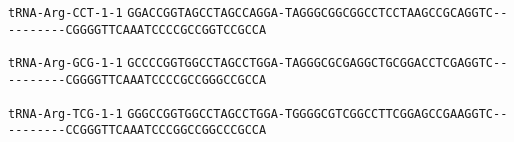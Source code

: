 \documentclass{article}
\newcommand{\rnabox}[1]{\colorbox{#1}{\texttt{#1}}}
\begin{document}
\vspace{-0.5mm}

\texttt{tRNA-Arg-CCT-1-1}
\rnabox{G}\rnabox{G}\rnabox{A}\rnabox{C}\rnabox{C}\rnabox{G}\rnabox{G}\rnabox{T}\rnabox{A}\rnabox{G}\rnabox{C}\rnabox{C}\rnabox{T}\rnabox{A}\rnabox{G}\rnabox{C}\rnabox{C}\rnabox{A}\rnabox{G}\rnabox{G}\rnabox{A}\rnabox{-}\rnabox{T}\rnabox{A}\rnabox{G}\rnabox{G}\rnabox{G}\rnabox{C}\rnabox{G}\rnabox{G}\rnabox{C}\rnabox{G}\rnabox{G}\rnabox{C}\rnabox{C}\rnabox{T}\rnabox{C}\rnabox{C}\rnabox{T}\rnabox{A}\rnabox{A}\rnabox{G}\rnabox{C}\rnabox{C}\rnabox{G}\rnabox{C}\rnabox{A}\rnabox{G}\rnabox{G}\rnabox{T}\rnabox{C}\rnabox{-}\rnabox{-}\rnabox{-}\rnabox{-}\rnabox{-}\rnabox{-}\rnabox{-}\rnabox{-}\rnabox{-}\rnabox{-}\rnabox{C}\rnabox{G}\rnabox{G}\rnabox{G}\rnabox{G}\rnabox{T}\rnabox{T}\rnabox{C}\rnabox{A}\rnabox{A}\rnabox{A}\rnabox{T}\rnabox{C}\rnabox{C}\rnabox{C}\rnabox{C}\rnabox{G}\rnabox{C}\rnabox{C}\rnabox{G}\rnabox{G}\rnabox{T}\rnabox{C}\rnabox{C}\rnabox{G}\rnabox{C}\rnabox{C}\rnabox{A}

\vspace{-0.5mm}

\texttt{tRNA-Arg-GCG-1-1}
\rnabox{G}\rnabox{C}\rnabox{C}\rnabox{C}\rnabox{C}\rnabox{G}\rnabox{G}\rnabox{T}\rnabox{G}\rnabox{G}\rnabox{C}\rnabox{C}\rnabox{T}\rnabox{A}\rnabox{G}\rnabox{C}\rnabox{C}\rnabox{T}\rnabox{G}\rnabox{G}\rnabox{A}\rnabox{-}\rnabox{T}\rnabox{A}\rnabox{G}\rnabox{G}\rnabox{G}\rnabox{C}\rnabox{G}\rnabox{C}\rnabox{G}\rnabox{A}\rnabox{G}\rnabox{G}\rnabox{C}\rnabox{T}\rnabox{G}\rnabox{C}\rnabox{G}\rnabox{G}\rnabox{A}\rnabox{C}\rnabox{C}\rnabox{T}\rnabox{C}\rnabox{G}\rnabox{A}\rnabox{G}\rnabox{G}\rnabox{T}\rnabox{C}\rnabox{-}\rnabox{-}\rnabox{-}\rnabox{-}\rnabox{-}\rnabox{-}\rnabox{-}\rnabox{-}\rnabox{-}\rnabox{-}\rnabox{C}\rnabox{G}\rnabox{G}\rnabox{G}\rnabox{G}\rnabox{T}\rnabox{T}\rnabox{C}\rnabox{A}\rnabox{A}\rnabox{A}\rnabox{T}\rnabox{C}\rnabox{C}\rnabox{C}\rnabox{C}\rnabox{G}\rnabox{C}\rnabox{C}\rnabox{G}\rnabox{G}\rnabox{G}\rnabox{C}\rnabox{C}\rnabox{G}\rnabox{C}\rnabox{C}\rnabox{A}

\vspace{-0.5mm}

\texttt{tRNA-Arg-TCG-1-1}
\rnabox{G}\rnabox{G}\rnabox{G}\rnabox{C}\rnabox{C}\rnabox{G}\rnabox{G}\rnabox{T}\rnabox{G}\rnabox{G}\rnabox{C}\rnabox{C}\rnabox{T}\rnabox{A}\rnabox{G}\rnabox{C}\rnabox{C}\rnabox{T}\rnabox{G}\rnabox{G}\rnabox{A}\rnabox{-}\rnabox{T}\rnabox{G}\rnabox{G}\rnabox{G}\rnabox{G}\rnabox{C}\rnabox{G}\rnabox{T}\rnabox{C}\rnabox{G}\rnabox{G}\rnabox{C}\rnabox{C}\rnabox{T}\rnabox{T}\rnabox{C}\rnabox{G}\rnabox{G}\rnabox{A}\rnabox{G}\rnabox{C}\rnabox{C}\rnabox{G}\rnabox{A}\rnabox{A}\rnabox{G}\rnabox{G}\rnabox{T}\rnabox{C}\rnabox{-}\rnabox{-}\rnabox{-}\rnabox{-}\rnabox{-}\rnabox{-}\rnabox{-}\rnabox{-}\rnabox{-}\rnabox{-}\rnabox{C}\rnabox{C}\rnabox{G}\rnabox{G}\rnabox{G}\rnabox{T}\rnabox{T}\rnabox{C}\rnabox{A}\rnabox{A}\rnabox{A}\rnabox{T}\rnabox{C}\rnabox{C}\rnabox{C}\rnabox{G}\rnabox{G}\rnabox{C}\rnabox{C}\rnabox{G}\rnabox{G}\rnabox{C}\rnabox{C}\rnabox{C}\rnabox{G}\rnabox{C}\rnabox{C}\rnabox{A}
\end{document}
